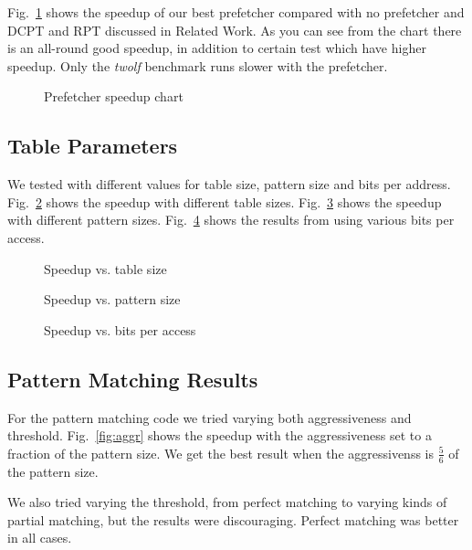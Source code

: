 Fig.~\ref{fig:prefetcher_speedup} shows the speedup of our best prefetcher
compared with no prefetcher and DCPT and RPT discussed in Related Work.
As you can see from the
chart there is an all-round good speedup, in addition to certain test which
have higher speedup. Only the \emph{twolf} benchmark runs slower with the
prefetcher.

\begin{figure}
	
	\caption{Prefetcher speedup chart}
	\label{fig:prefetcher_speedup}
\end{figure}

\subsection{Table Parameters}
We tested with different values for table size, pattern size and bits per address.
Fig.~\ref{fig:table_size_chart} shows the speedup with different table sizes.
Fig.~\ref{fig:pattern_size} shows the speedup with different pattern sizes.
Fig.~\ref{fig:bits} shows the results from using various bits per access.

\begin{figure}
	
	\caption{Speedup vs. table size}
	\label{fig:table_size_chart}
\end{figure}

\begin{figure}
	
	\caption{Speedup vs. pattern size}
	\label{fig:pattern_size}
\end{figure}

\begin{figure}
	
	\caption{Speedup vs. bits per access}
	\label{fig:bits}
\end{figure}

\subsection{Pattern Matching Results}
For the pattern matching code we tried varying both aggressiveness and
threshold. Fig.~\ref{fig:aggr} shows the speedup with the aggressiveness set to
a fraction of the pattern size. We get the best result when the aggressivenss
is $\frac{5}{6}$ of the pattern size.

We also tried varying the threshold, from perfect matching to varying kinds of
partial matching, but the results were discouraging. Perfect matching was
better in all cases.

